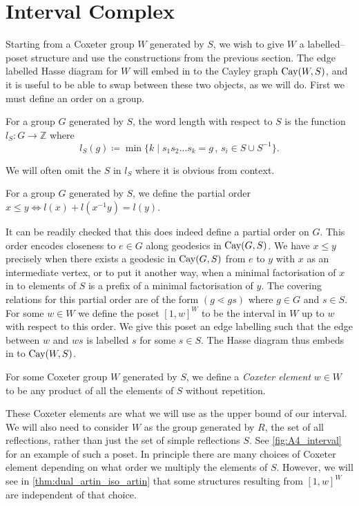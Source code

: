 \documentclass[class=article, crop=false]{standalone}
\begin{document}
\section{Interval Complex}
\label{sec:interval_cx}
Starting from a Coxeter group $W$ generated by $S$, we wish to give $W$ a labelled--poset structure and use the constructions from the previous section. The edge labelled Hasse diagram for $W$ will embed in to the Cayley graph $\text{Cay}(W,S)$, and it is useful to be able to swap between these two objects, as we will do. First we must define an order on a group.

\begin{definition}
    For a group $G$ generated by $S$, the word length with respect to $S$ is the function $l_S:G\to \mathbb{Z}$ where
    \begin{equation*}
        l_S(g) \coloneq \min\{k \mid s_1s_2\ldots s_k=g \,,\, s_i \in S \cup S^{-1}\}.
    \end{equation*}
\end{definition}
We will often omit the $S$ in $l_S$ where it is obvious from context.

\begin{definition}
    For a group $G$ generated by $S$, we define the partial order $x \leq y \iff l(x) + l(x^{-1}y) = l(y)$.
\end{definition}

It can be readily checked that this does indeed define a partial 
order on $G$. This order encodes closeness to $e \in G$ along geodesics in $\text{Cay}(G,S)$. We have $x \leq y$ precisely when there exists a geodesic in $\text{Cay}(G, S)$ from $e$ to $y$ with $x$ as an intermediate vertex, or to put it another way, when a minimal factorisation of $x$ in to elements of $S$ is a prefix of a minimal factorisation of $y$. The covering relations for this partial order are of the form $(g \lessdot gs)$ where $g \in G$ and $s \in S$.
For some $w \in W$ we define the poset $[1,w]^W$ to be the interval in $W$ up to $w$ with respect to this order. We give this poset an edge labelling such that the edge between $w$ and $ws$ is labelled $s$ for some $s \in S$. The Hasse diagram thus embeds in to $\text{Cay}(W,S)$.

\begin{definition}
	For some Coxeter group $W$ generated by $S$, we define a \emph{Coxeter element} $w\in W$ to be any product of all the elements of $S$ without repetition.
\end{definition}

These Coxeter elements are what we will use as the upper bound of our interval. We will also need to consider $W$ as the group generated by $R$, the set of all reflections, rather than just the set of simple reflections $S$. See \cref{fig:A4_interval} for an example of such a poset. In principle there are many choices of Coxeter element depending on what order we multiply the elements of $S$. 
However, we will see in \cref{thm:dual_artin_iso_artin} that some structures resulting from $[1,w]^W$ are independent of that choice.
\end{document}
